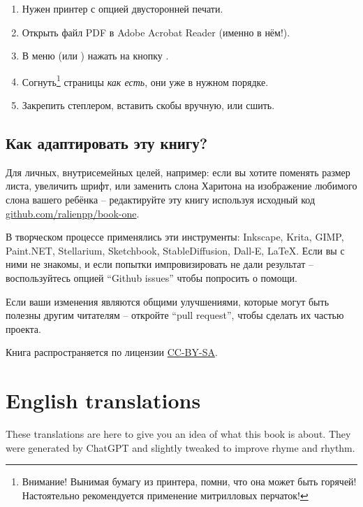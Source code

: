 \documentclass[a5paper,11pt]{memoir}
\begin{document}
\begin{enumerate}
    \item Нужен принтер с опцией двусторонней печати.
    \item Открыть файл PDF в Adobe Acrobat Reader (именно в нём!).
    \item В меню  (или ) нажать на кнопку .
    \item Согнуть\footnote[2]{Внимание! Вынимая бумагу из принтера, помни, что она может быть горячей! Настоятельно рекомендуется применение митрилловых перчаток!} страницы \emph{как есть}, они уже в нужном порядке.
    \item Закрепить степлером, вставить скобы вручную, или сшить.
\end{enumerate}

\subsection{Как адаптировать эту книгу?}
Для личных, внутрисемейных целей, например: если вы хотите поменять размер листа, увеличить шрифт, или заменить слона Харитона на изображение любимого слона вашего ребёнка -- редактируйте эту книгу используя исходный код  \href{https://github.com/ralienpp/book-one}{github.com/ralienpp/book-one}.

В творческом процессе применялись эти инструменты: Inkscape, Krita, GIMP, Paint.NET, Stellarium, Sketchbook, StableDiffusion, Dall-E, \LaTeX. Если вы с ними не знакомы, и если попытки импровизировать не дали результат -- воспользуйтесь опцией ``Github issues'' чтобы попросить о помощи.

Если ваши изменения являются общими улучшениями, которые могут быть полезны другим читателям -- откройте ``pull request'', чтобы сделать их частью проекта.

Книга распространяется по лицензии \href{https://creativecommons.org/licenses/by-sa/4.0/}{CC-BY-SA}.


\clearpage
\section*{English translations}
These translations are here to give you an idea of what this book is about. They were generated by ChatGPT and slightly tweaked to improve rhyme and rhythm.
\end{document}
